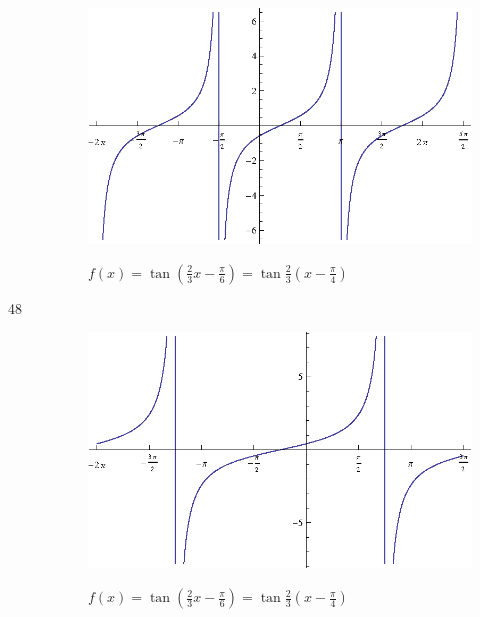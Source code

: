 \documentclass{exam}
\begin{document}
\begin{description}
        \begin{figure}[H]
          \centering
          \includegraphics[scale=0.9]{exercise47.eps}

          $f(x) = \tan \left( \frac{2}{3} x - \frac{\pi}{6} \right) = \tan \frac{2}{3} \left( x - \frac{\pi}{4} \right)$
        \end{figure}

      \item[48] 

        \begin{figure}[H]
          \centering
          \includegraphics[scale=0.9]{exercise48.eps}

          $f(x) = \tan \left( \frac{2}{3} x - \frac{\pi}{6} \right) = \tan \frac{2}{3} \left( x - \frac{\pi}{4} \right)$
        \end{figure}


\end{description}
\end{document}
